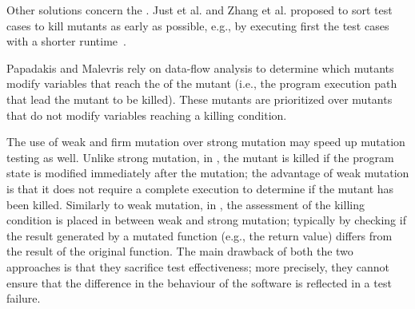 Other solutions concern the . Just et al. \cite{just2012using} and Zhang et al. \cite{zhang2013faster} proposed to sort test cases to kill mutants as early as possible, e.g., by executing first the test cases with a shorter runtime~\cite{just2012using}. 

Papadakis and Malevris \cite{papadakis2011automatically} rely on data-flow analysis to determine which mutants modify variables that reach the  of the mutant (i.e., the program execution path that lead the mutant to be killed). These mutants are prioritized over mutants that do not modify variables reaching a killing condition.


The use of weak and firm mutation over strong mutation may speed up mutation testing as well.
Unlike strong mutation, 
in  \cite{ammann2016introduction}, the mutant is killed if the program state is modified immediately after the mutation; the advantage of weak mutation is that it does not require a complete execution to determine if the mutant has been killed. Similarly to weak mutation, in  \cite{ammann2016introduction}, the assessment of the killing condition is placed in between weak and strong mutation; typically by checking if the result generated by a mutated function (e.g., the return value) differs from the result of the original function. The main drawback of both the two approaches is that they sacrifice test effectiveness; more precisely, they cannot ensure that the difference in the behaviour of the software is reflected in a test failure.


